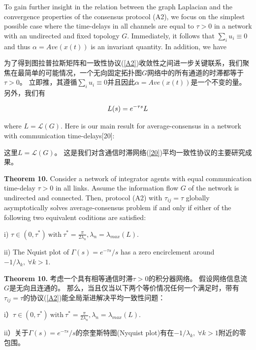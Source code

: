 \documentclass{article}
\begin{document}
{\color[gray]{0.5}
\noindent To gain further insight in the relation between the graph Laplacian and the convergence properties of the consensus protocol (A2), we focus on the simplest possible case where the time-delays in all channels are equal to $\tau>0$ in a network with an undirected and fixed topology $G$. 
Immediately, it follows that $\sum_i u_i \equiv 0$ and thus $\alpha = Ave(x(t))$ is an invariant quantity. 
In addition, we have
}

\noindent 为了得到图拉普拉斯矩阵和一致性协议(\ref{A2})收敛性之间进一步关键联系，我们聚焦在最简单的可能情况，一个无向固定拓扑图$G$网络中的所有通道的时滞都等于$\tau > 0$。
立即推，其遵循$\sum_i u_i \equiv 0$并且因此$\alpha = Ave(x(t))$是一个不变的量。
另外，我们有

\begin{equation}
    L(s) = e^{-\tau s}L
    \notag
\end{equation}

{\color[gray]{0.5}
\noindent where $L=\mathcal{L}(G)$. 
Here is our main result for average-consensus in a network with communication time-delays[20]: 
}

\noindent 这里$L=\mathcal{L}(G)$。
这是我们对含通信时滞网络(\ref{20})平均一致性协议的主要研究成果。

{\color[gray]{0.5}
\noindent \textbf{Theorem 10.} Consider a network of integrator agents with equal communication time-delay $\tau>0$ in all links.
Assume the information flow $G$ of the network is undirected and connected. 
Then, protocol (A2) with $\tau_{ij}=\tau$ globally asymptotically solves average-consensus problem if and only if either of the following two equivalent coditions are satisfied: 

i) $\tau \in (0, \tau^*)\ \text{with}\ \tau^*=\frac{\pi}{2\lambda_n}, \lambda_n=\lambda_{max}(L)$.

ii) The Nquist plot of $\Gamma(s) = e^{-\tau s}/s$ has a zero encirclement around $-1/\lambda_k,\ \forall k > 1$. 
}

\noindent \textbf{Theorem 10.} 考虑一个具有相等通信时滞$\tau > 0$的积分器网络。
假设网络信息流$G$是无向且连通的。
那么，当且仅当以下两个等价情况任何一个满足时，带有$\tau_{ij} = \tau$的协议(\ref{A2})能全局渐进解决平均一致性问题：

i）$\tau \in (0, \tau^*)\ \text{with}\ \tau^*=\frac{\pi}{2\lambda_n}, \lambda_n=\lambda_{max}(L)$.

ii）关于$\Gamma(s) = e^{-\tau s}/s$的奈奎斯特图(Nyquist plot)有在$-1/\lambda_k,\ \forall k > 1$附近的零包围。
\end{document}
